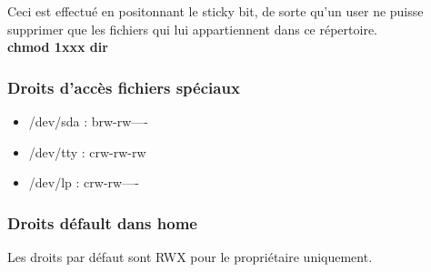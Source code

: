 \documentclass[a4paper,10pt,final,fleqn]{article}
\begin{document}
				Ceci est effectué en positonnant le sticky bit, de sorte qu'un user ne puisse supprimer que les fichiers qui lui appartiennent dans ce répertoire.\\

				\textbf{chmod 1xxx dir}\\

			\subsubsection{Droits d'accès fichiers spéciaux}

				 \begin{itemize}
				 	\item /dev/sda : brw-rw----
				 	\item /dev/tty : crw-rw-rw
				 	\item /dev/lp  : crw-rw----
				 \end{itemize}

			\subsubsection{Droits défault dans home}

				Les droits par défaut sont RWX pour le propriétaire uniquement.\\
\end{document}
